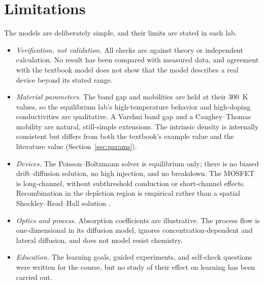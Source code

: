 \documentclass[conference]{IEEEtran}
\begin{document}
\section{Limitations}\label{sec:limits}
The models are deliberately simple, and their limits are stated in each lab.
\begin{itemize}
\item \emph{Verification, not validation.} All checks are against theory or independent calculation. No result has been compared with measured data, and agreement with the textbook model does not show that the model describes a real device beyond its stated range.
\item \emph{Material parameters.} The band gap and mobilities are held at their 300~K values, so the equilibrium lab's high-temperature behavior and high-doping conductivities are qualitative. A Varshni band gap \cite{varshni1967} and a Caughey--Thomas mobility \cite{caughey1967} are natural, still-simple extensions. The intrinsic density is internally consistent but differs from both the textbook's example value and the literature value (Section~\ref{sec:params}).
\item \emph{Devices.} The Poisson--Boltzmann solver is equilibrium only; there is no biased drift--diffusion solution, no high injection, and no breakdown. The MOSFET is long-channel, without subthreshold conduction or short-channel effects. Recombination in the depletion region is empirical rather than a spatial Shockley--Read--Hall solution \cite{shockleyread1952,hall1952}.
\item \emph{Optics and process.} Absorption coefficients are illustrative. The process flow is one-dimensional in its diffusion model, ignores concentration-dependent and lateral diffusion, and does not model resist chemistry.
\item \emph{Education.} The learning goals, guided experiments, and self-check questions were written for the course, but no study of their effect on learning has been carried out.
\end{itemize}

\end{document}
